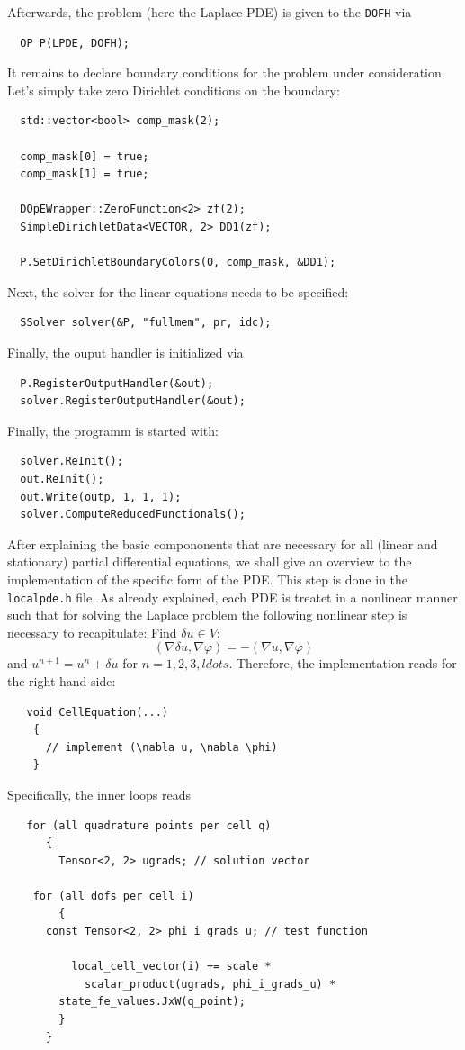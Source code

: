 \documentclass[prodmode,acmtoms]{acmsmall}
\numberwithin{equation}{section}
\renewcommand{\phi}{\varphi}
\begin{document}
Afterwards, the problem (here the Laplace PDE) is given to the \texttt{DOFH} via
\begin{lstlisting}
  OP P(LPDE, DOFH);
\end{lstlisting}
It remains to declare boundary conditions for the problem under consideration. 
Let's simply take zero Dirichlet conditions on the boundary:
\begin{lstlisting}
  std::vector<bool> comp_mask(2);

  comp_mask[0] = true;
  comp_mask[1] = true;

  DOpEWrapper::ZeroFunction<2> zf(2);
  SimpleDirichletData<VECTOR, 2> DD1(zf);

  P.SetDirichletBoundaryColors(0, comp_mask, &DD1);
\end{lstlisting}
Next, the solver for the linear equations needs to be specified:
\begin{lstlisting}
  SSolver solver(&P, "fullmem", pr, idc);
\end{lstlisting}
Finally, the ouput handler is initialized via
\begin{lstlisting}
  P.RegisterOutputHandler(&out);
  solver.RegisterOutputHandler(&out);
\end{lstlisting}
Finally, the programm is started with:
\begin{lstlisting}
  solver.ReInit();
  out.ReInit();
  out.Write(outp, 1, 1, 1);
  solver.ComputeReducedFunctionals();
\end{lstlisting}
After explaining the basic compononents that are necessary for all  
(linear and stationary) partial differential equations, we shall give 
an overview to the implementation of the specific form of the PDE. 
This step is done in the \texttt{localpde.h} file. As already explained,
each PDE is treatet in a nonlinear manner such that for solving 
the Laplace problem the following nonlinear step is necessary to recapitulate:
Find $\delta u\in V$:
\[
(\nabla \delta u, \nabla \phi) = -(\nabla u, \nabla \phi) 
\]
and $u^{n+1} = u^n + \delta u$ for $n=1,2,3,ldots$.
Therefore, the implementation reads for the right hand side:
\begin{lstlisting}
   void CellEquation(...)
    {
      // implement (\nabla u, \nabla \phi) 
    }
\end{lstlisting}
Specifically, the inner loops reads
\begin{lstlisting}
   for (all quadrature points per cell q)
      {
        Tensor<2, 2> ugrads; // solution vector
 
	for (all dofs per cell i)
        {
	  const Tensor<2, 2> phi_i_grads_u; // test function

          local_cell_vector(i) += scale * 
            scalar_product(ugrads, phi_i_grads_u) *
	    state_fe_values.JxW(q_point);
        }
      }
\end{lstlisting}
\end{document}
